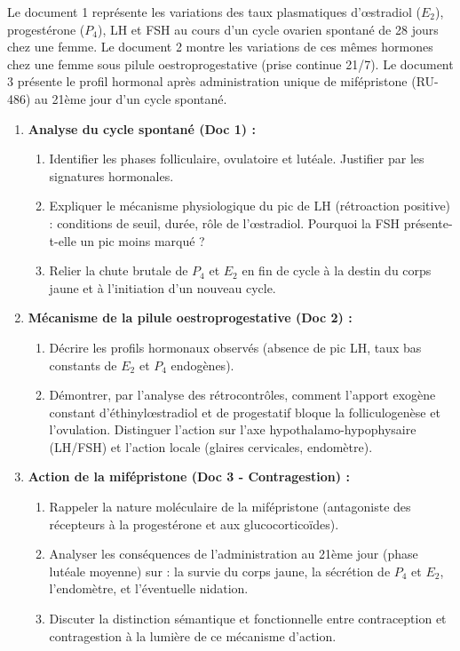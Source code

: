 \documentclass[11pt]{article}
\begin{document}
\begin{exercice}
Le document 1 représente les variations des taux plasmatiques d'œstradiol ($E_2$), progestérone ($P_4$), LH et FSH au cours d'un cycle ovarien spontané de 28 jours chez une femme. Le document 2 montre les variations de ces mêmes hormones chez une femme sous pilule oestroprogestative (prise continue 21/7). Le document 3 présente le profil hormonal après administration unique de mifépristone (RU-486) au 21ème jour d'un cycle spontané.

\begin{enumerate}
    \item \textbf{Analyse du cycle spontané (Doc 1) :} 
    \begin{enumerate}
        \item Identifier les phases folliculaire, ovulatoire et lutéale. Justifier par les signatures hormonales.
        \item Expliquer le mécanisme physiologique du pic de LH (rétroaction positive) : conditions de seuil, durée, rôle de l'œstradiol. Pourquoi la FSH présente-t-elle un pic moins marqué ?
        \item Relier la chute brutale de $P_4$ et $E_2$ en fin de cycle à la destin du corps jaune et à l'initiation d'un nouveau cycle.
    \end{enumerate}
    \item \textbf{Mécanisme de la pilule oestroprogestative (Doc 2) :} 
    \begin{enumerate}
        \item Décrire les profils hormonaux observés (absence de pic LH, taux bas constants de $E_2$ et $P_4$ endogènes). 
        \item Démontrer, par l'analyse des rétrocontrôles, comment l'apport exogène constant d'éthinylœstradiol et de progestatif bloque la folliculogenèse et l'ovulation. Distinguer l'action sur l'axe hypothalamo-hypophysaire (LH/FSH) et l'action locale (glaires cervicales, endomètre).
    \end{enumerate}
    \item \textbf{Action de la mifépristone (Doc 3 - Contragestion) :} 
    \begin{enumerate}
        \item Rappeler la nature moléculaire de la mifépristone (antagoniste des récepteurs à la progestérone et aux glucocorticoïdes).
        \item Analyser les conséquences de l'administration au 21ème jour (phase lutéale moyenne) sur : la survie du corps jaune, la sécrétion de $P_4$ et $E_2$, l'endomètre, et l'éventuelle nidation. 
        \item Discuter la distinction sémantique et fonctionnelle entre \og contraception \fg{} et \og contragestion \fg{} à la lumière de ce mécanisme d'action.
    \end{enumerate}
\end{enumerate}
\end{exercice}
\end{document}
